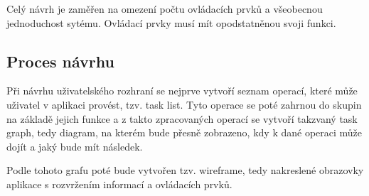 Celý návrh je zaměřen na omezení počtu ovládacích prvků a všeobecnou jednoduchost sytému. Ovládací prvky musí mít opodstatněnou svoji funkci.

\subsection{Proces návrhu}
Při návrhu uživatelského rozhraní se nejprve vytvoří seznam operací, které může uživatel v aplikaci provést, tzv. task list. Tyto operace se poté zahrnou do skupin na základě jejich funkce a z takto zpracovaných operací se vytvoří takzvaný task graph, tedy diagram, na kterém bude přesně zobrazeno, kdy k dané operaci může dojít a jaký bude mít následek.

Podle tohoto grafu poté bude vytvořen tzv. wireframe, tedy nakreslené obrazovky aplikace s rozvržením informací a ovládacích prvků.

